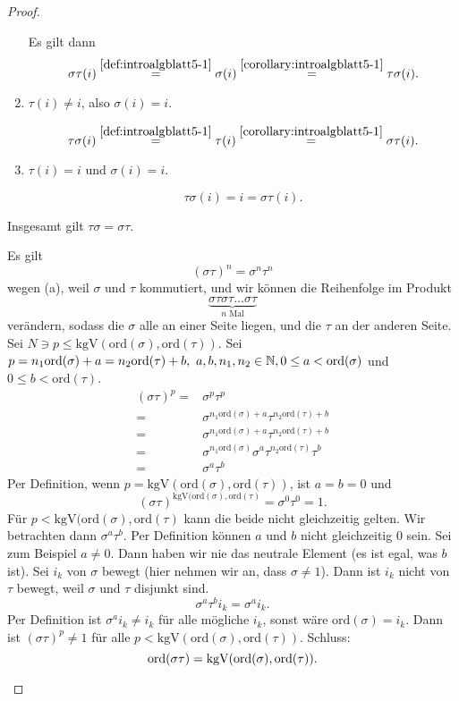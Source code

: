 \begin{proof}
\begin{parts}
\begin{enumerate}[label=(\roman*)]
				Es gilt dann
				\[
					\sigma\tau(i)\overset{\ref{def:introalgblatt5-1}}{=}\sigma(i)\overset{\ref{corollary:introalgblatt5-1}}{=}\tau\sigma(i)
				.\] 
			\item $\tau(i)\neq i$, also $\sigma(i)=i$.

				\[
					\tau\sigma(i)\overset{\ref{def:introalgblatt5-1}}{=}\tau(i)\overset{\ref{corollary:introalgblatt5-1}}{=}\sigma\tau(i)
				.\] 
			\item $\tau(i)=i$ und $\sigma(i)=i$.

				\[
				\tau\sigma(i)=i=\sigma\tau(i)
				.\] 
		\end{enumerate}
		Insgesamt gilt $\tau\sigma=\sigma\tau$.
	\item Es gilt
		\[
			(\sigma\tau)^n=\sigma^n\tau^n
		\]
		wegen (a), weil $\sigma$ und $\tau$ kommutiert, und wir können die Reihenfolge im Produkt
		\[
			\underbrace{\sigma\tau\sigma\tau\dots\sigma\tau}_{n\text{ Mal}}
		\]
		verändern, sodass die $\sigma$ alle an einer Seite liegen, und die $\tau$ an der anderen Seite. Sei $N\ni p\le\text{kgV}(\text{ord}(\sigma),\text{ord}(\tau))$. Sei $p=n_1\text{ord}(\sigma)+a=n_2\text{ord}(\tau)+b,~a,b,n_1,n_2\in \mathbb{N}, 0\le a < \text{ord}(\sigma)$ und $0\le b <\text{ord}(\tau)$.
		\begin{align*}
		(\sigma\tau)^p =& \sigma^p\tau^p\\
		=& \sigma^{n_1\text{ord}(\sigma)+a}\tau^{n_2\text{ord}(\tau)+b}\\
				=&\sigma^{n_1\text{ord}(\sigma)+a}\tau^{n_2\text{ord}(\tau)+b}\\
				=&\sigma^{n_1\text{ord}(\sigma)}\sigma^a\tau^{n_2\text{ord}(\tau)}\tau^b\\
					=&\sigma^a\tau^b
		\end{align*}
		Per Definition, wenn $p=\text{kgV}(\text{ord}(\sigma),\text{ord}(\tau))$, ist $a=b=0$ und
		\[
			(\sigma\tau)^{\text{kgV}(\text{ord}(\sigma),\text{ord}(\tau)}=\sigma^0\tau^0=1
		.\] 
		F\"{u}r $p<\text{kgV}(\text{ord}(\sigma),\text{ord}(\tau)$ kann die beide nicht gleichzeitig gelten. Wir betrachten dann $\sigma^a\tau^b$. Per Definition können $a$ und $b$ nicht gleichzeitig $0$ sein. Sei zum Beispiel $a\neq 0$. Dann haben wir nie das neutrale Element (es ist egal, was $b$ ist). Sei $i_k$ von $\sigma$ bewegt (hier nehmen wir an, dass $\sigma\neq 1$). Dann ist $i_k$ nicht von $\tau$ bewegt, weil $\sigma$ und $\tau$ disjunkt sind.
		\[
		\sigma^a\tau^b i_k =\sigma^a i_k
		.\] 
	Per Definition ist $\sigma^a i_k\neq i_k$ f\"{u}r alle mögliche $i_k$, sonst wäre $\text{ord}(\sigma)=i_k$. Dann ist $(\sigma\tau)^p\neq 1$ f\"{u}r alle $p<\text{kgV}(\text{ord}(\sigma),\text{ord}(\tau))$. Schluss:
	 \[
		 \text{ord}(\sigma\tau)=\text{kgV}(\text{ord}(\sigma),\text{ord}(\tau))
	.\qedhere\] 
	\end{parts}
\end{proof}
